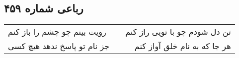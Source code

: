 \begin{center}
\section*{رباعی شماره ۴۵۹}
\label{sec:sh459}
\begin{longtable}{l p{0.5cm} r}
رویت بینم چو چشم را باز کنم
&&
تن دل شودم چو با تویی راز کنم
\\
جز نام تو پاسخ ندهد هیچ کسی
&&
هر جا که به نام خلق آواز کنم
\\
\end{longtable}
\end{center}
